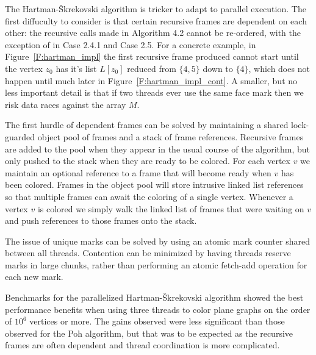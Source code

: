 \documentclass[12pt,letterpaper]{article}
\theoremstyle{plain}
\theoremstyle{definition}
\theoremstyle{break}
\begin{document}
The Hartman-\v{S}krekovski algorithm is tricker to adapt to
parallel execution. The first diffuculty to consider is that certain recursive
frames are
dependent on each other: the recursive calls made in
Algorithm 4.2 cannot be re-ordered, with the exception of
in Case 2.4.1 and Case 2.5. For a concrete example,
in Figure~\ref{F:hartman_impl} the first recursive
frame produced cannot start until the vertex $z_0$ has it's list $L[z_0]$
reduced from $\{4,5\}$ down to $\{4\}$, which does not happen
until much later in Figure~\ref{F:hartman_impl_cont}. A smaller, but no less important detail is that
if two threads ever use the
same face mark then we risk data races against the array $M$.

The first hurdle of dependent frames can be solved by maintaining a shared
lock-guarded object pool
of frames and a stack of frame references. Recursive frames are added to the
pool when they appear in the usual course of the algorithm, but
only pushed to the stack when they
are ready to be colored. For each vertex $v$ we maintain an optional reference
to a frame that will become ready when $v$ has been colored. Frames in the
object pool will store intrusive linked list references so that multiple frames
can await the coloring of a single vertex. Whenever a vertex $v$ is
colored we simply walk the linked list of frames that were waiting on $v$
and push references to those frames onto the stack.

The issue of unique marks can be solved by using an atomic mark counter
shared between all threads. Contention can be minimized by having
threads reserve marks in large chunks, rather than performing an
atomic fetch-add operation for each new mark.

Benchmarks for the parallelized Hartman-\v{S}krekovski algorithm showed
the best performance
benefits when using three threads to color plane graphs on the order
of $10^6$ vertices or more.
The gains observed were less significant than those observed for the
Poh algorithm, but that was to be expected as the recursive frames are often
dependent and thread coordination is more complicated.
\end{document}
